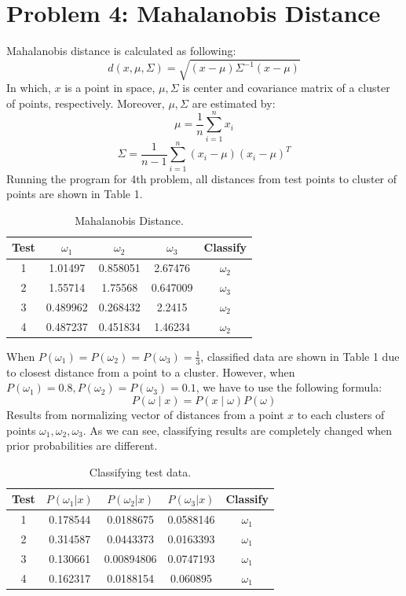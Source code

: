 \documentclass[a4paper, 11pt]{article}
\begin{document}
\section*{Problem 4: Mahalanobis Distance}
Mahalanobis distance is calculated as following:
\[ d(x,\mu, \Sigma) =\sqrt{(x-\mu)\Sigma^{-1}(x-\mu)}\]
In which, $x$ is a point in space, $\mu, \Sigma$ is center and covariance matrix of a cluster of points, respectively. Moreover, $\mu, \Sigma$ are estimated by:
\[ \mu = \frac{1}{n}\sum_{i=1}^{n} x_i\]
\[ \Sigma = \frac{1}{n-1}\sum_{i=1}^{n} (x_i-\mu)(x_i-\mu)^T\]
Running the program for 4th problem, all distances from test points to cluster of points are shown in Table 1.
\begin{table}[ht]
  \centering
  \begin{tabular}{|c|c|c|c|c|}
    \hline
    Test & $\omega_1$ & $\omega_2$  & $\omega_3$ & Classify   \\\hline
    1    & 1.01497    & 0.858051   & 2.67476    & $\omega_2$ \\ \hline
    2    & 1.55714    & 1.75568    & 0.647009   & $\omega_3$ \\  \hline
    3    & 0.489962   & 0.268432   & 2.2415     & $\omega_2$ \\ \hline
    4    & 0.487237   & 0.451834   & 1.46234    & $\omega_2$ \\
    \hline
  \end{tabular}
  \caption{Mahalanobis Distance.}
\end{table}
When $P(\omega_1) = P(\omega_2) = P(\omega_3) = \frac{1}{3}$, classified data are shown in Table 1 due to closest distance from a point to a cluster. However, when $P(\omega_1) = 0.8, P(\omega_2) = P(\omega_3) = 0.1$, we have to use the following formula:
\[P(\omega\mid x) = P(x\mid\omega)P(\omega)\]
Results from normalizing vector of distances from a point $x$ to each clusters of points $\omega_1, \omega_2, \omega_3$. As we can see, classifying results are completely changed when prior probabilities are different.
\begin{table}[ht]
  \centering
  \begin{tabular}{|c|c|c|c|c|}
    \hline
    Test & $P(\omega_1|x)$ & $P(\omega_2|x)$ & $P(\omega_3|x)$ & Classify   \\\hline
    1    & 0.178544        & 0.0188675       & 0.0588146       & $\omega_1$ \\ \hline
    2    & 0.314587        & 0.0443373       & 0.0163393       & $\omega_1$ \\ \hline
    3    & 0.130661        & 0.00894806      & 0.0747193       & $\omega_1$ \\ \hline
    4    & 0.162317        & 0.0188154       & 0.060895        & $\omega_1$ \\
    \hline
  \end{tabular}
  \caption{Classifying test data.}
\end{table}
\end{document}

